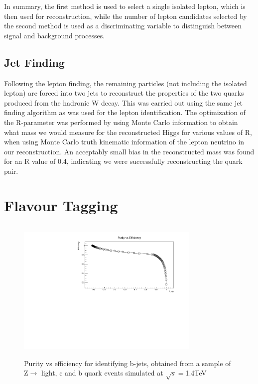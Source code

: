 In summary, the first method is used to select a single isolated lepton, which is then used for reconstruction, while the number of lepton candidates selected by the second method is used as a discriminating variable to distinguish between signal and background processes. 

\subsection{Jet Finding}

Following the lepton finding, the remaining particles (not including the isolated lepton) are forced into two jets to reconstruct the properties of the two quarks produced from the hadronic W decay. This was carried out using the same jet finding algorithm as was used for the lepton identification. The optimization of the R-parameter was performed by using Monte Carlo information to obtain what mass we would measure for the reconstructed Higgs for various values of R, when using Monte Carlo truth kinematic information of the lepton neutrino in our reconstruction. An acceptably small bias in the reconstructed mass was found for an R value of 0.4, indicating we were successfully reconstructing the quark pair.

\section{Flavour Tagging}

\begin{figure}[b]
  \centering
  \includegraphics[width=0.78\textwidth,height=7cm,keepaspectratio]{figures/btag_crosses}
  \caption[B-Tagging Purity vs Efficiency]{Purity vs efficiency for identifying b-jets, obtained from a sample of Z$\rightarrow$ light, c and b quark events simulated at $\sqrt{s}=$1.4TeV}
  \label{btag}
\end{figure}

